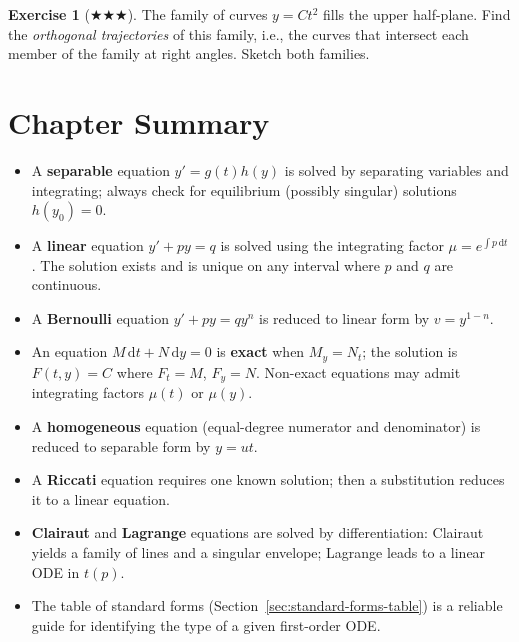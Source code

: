 \documentclass[12pt,a4paper,openany]{book}
\theoremstyle{definition}
\newtheorem{exercise}{Exercise}[chapter]
\theoremstyle{plain}
\theoremstyle{remark}
\newcommand{\dd}{\mathrm{d}}
\begin{document}
\begin{exercise}[$\bigstar\bigstar\bigstar$]
\label{exer:ch2-orthogonal}
The family of curves $y = Ct^2$ fills the upper half-plane. Find the \emph{orthogonal trajectories} of this family, i.e., the curves that intersect each member of the family at right angles. Sketch both families.
\end{exercise}

\section*{Chapter Summary}

\begin{itemize}[leftmargin=1.5cm]
  \item A \textbf{separable} equation $y' = g(t)h(y)$ is solved by separating variables and integrating; always check for equilibrium (possibly singular) solutions $h(y_0)=0$.
  \item A \textbf{linear} equation $y' + py = q$ is solved using the integrating factor $\mu = e^{\int p\,\dd t}$. The solution exists and is unique on any interval where $p$ and $q$ are continuous.
  \item A \textbf{Bernoulli} equation $y' + py = qy^n$ is reduced to linear form by $v = y^{1-n}$.
  \item An equation $M\,\dd t + N\,\dd y = 0$ is \textbf{exact} when $M_y = N_t$; the solution is $F(t,y)=C$ where $F_t = M$, $F_y = N$. Non-exact equations may admit integrating factors $\mu(t)$ or $\mu(y)$.
  \item A \textbf{homogeneous} equation (equal-degree numerator and denominator) is reduced to separable form by $y = ut$.
  \item A \textbf{Riccati} equation requires one known solution; then a substitution reduces it to a linear equation.
  \item \textbf{Clairaut} and \textbf{Lagrange} equations are solved by differentiation: Clairaut yields a family of lines and a singular envelope; Lagrange leads to a linear ODE in $t(p)$.
  \item The table of standard forms (Section~\ref{sec:standard-forms-table}) is a reliable guide for identifying the type of a given first-order ODE.
\end{itemize}

\end{document}
